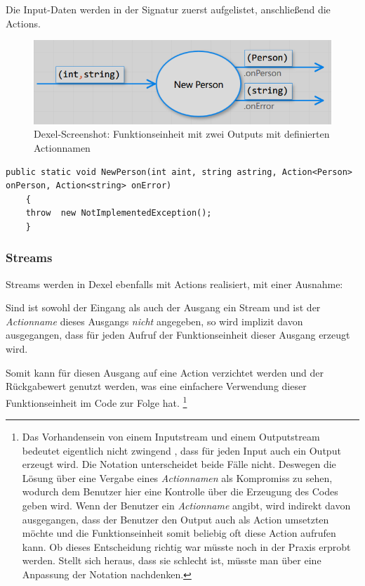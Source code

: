 	Die Input-Daten werden in der Signatur zuerst aufgelistet, anschließend die Actions.
	
			\begin{figure}[H]
				\centering
				\includegraphics[width=\linewidth]{./img/roslyn_multipleOutputs.png} 
				\caption{Dexel-Screenshot: Funktionseinheit mit zwei Outputs mit definierten Actionnamen}
			\end{figure}
			
	

	
	\begin{lstlisting}[caption=Mit Dexel generierter Code ]
	public static void NewPerson(int aint, string astring, Action<Person> onPerson, Action<string> onError)
	{
	throw  new NotImplementedException();
	}
	\end{lstlisting}
	 \subsubsection{Streams}

	Streams werden in Dexel ebenfalls mit Actions realisiert, mit einer Ausnahme:
	
	Sind ist sowohl der Eingang als auch der Ausgang ein Stream und ist der \textit{Actionname} dieses Ausgangs \textit{nicht} angegeben, so wird  implizit davon ausgegangen, dass für jeden Aufruf der Funktionseinheit dieser Ausgang erzeugt wird. 
	
	Somit kann für diesen Ausgang auf eine Action verzichtet werden und der Rückgabewert genutzt werden, was eine einfachere Verwendung dieser Funktionseinheit im Code zur Folge hat.
	\footnote{	Das Vorhandensein von einem Inputstream und einem Outputstream bedeutet eigentlich nicht zwingend , dass für jeden Input auch ein Output erzeugt wird. Die Notation unterscheidet beide Fälle nicht. Deswegen die Lösung über eine Vergabe eines \textit{Actionnamen} als Kompromiss zu sehen, wodurch dem Benutzer hier eine Kontrolle über die Erzeugung des Codes geben wird. Wenn der Benutzer ein \textit{Actionname} angibt, wird indirekt davon ausgegangen, dass der Benutzer den Output auch als Action umsetzten möchte und die Funktionseinheit somit beliebig oft diese Action aufrufen kann. Ob dieses Entscheidung richtig war müsste  noch in der Praxis erprobt werden. Stellt sich heraus,	dass sie schlecht ist, müsste man über eine Anpassung der Notation nachdenken.}
	
